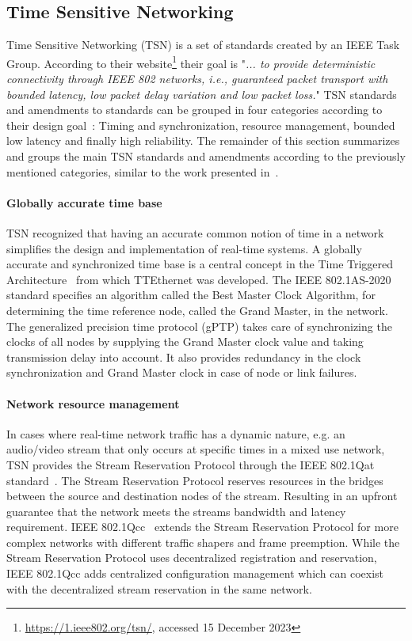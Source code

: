 \subsection{Time Sensitive Networking}
\label{sec:tsn}
Time Sensitive Networking (TSN) is a set of standards created by an IEEE Task Group. According to their website\footnote{\url{https://1.ieee802.org/tsn/}, accessed 15 December 2023} their goal is "\textit{... to provide deterministic connectivity through IEEE 802 networks, i.e., guaranteed packet transport with bounded latency, low packet delay variation and low packet loss.}" TSN standards and amendments to standards can be grouped in four categories according to their design goal~\cite{ashjaei2021time}: Timing and synchronization, resource management, bounded low latency and finally high reliability. The remainder of this section summarizes and groups the main TSN standards and amendments according to the previously mentioned categories, similar to the work presented in~\cite{ashjaei2021time}.

\paragraph{Globally accurate time base} TSN recognized that having an accurate common notion of time in a network simplifies the design and implementation of real-time systems. A globally accurate and synchronized time base is a central concept in the Time Triggered Architecture~\cite{kopetz2003time} from which TTEthernet was developed. The IEEE 802.1AS-2020~\cite{IEEE8021AS} standard specifies an algorithm called the Best Master Clock Algorithm, for determining the time reference node, called the Grand Master, in the network. The generalized precision time protocol (gPTP) takes care of synchronizing the clocks of all nodes by supplying the Grand Master clock value and taking transmission delay into account. It also provides redundancy in the clock synchronization and Grand Master clock in case of node or link failures.

\paragraph{Network resource management} In cases where real-time network traffic has a dynamic nature, e.g. an audio/video stream that only occurs at specific times in a mixed use network, TSN provides the Stream Reservation Protocol through the IEEE 802.1Qat standard~\cite{IEEE8021Qat}. The Stream Reservation Protocol reserves resources in the bridges between the source and destination nodes of the stream. Resulting in an upfront guarantee that the network meets the streams bandwidth and latency requirement. IEEE 802.1Qcc~\cite{IEEE8021Qcc} extends the Stream Reservation Protocol for more complex networks with different traffic shapers and frame preemption. While the Stream Reservation Protocol uses decentralized registration and reservation, IEEE 802.1Qcc adds centralized configuration management which can coexist with the decentralized stream reservation in the same network.

